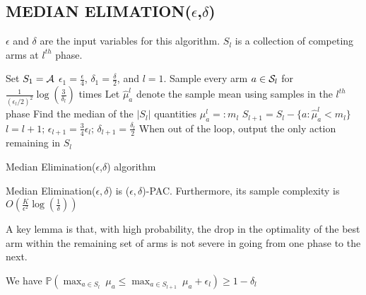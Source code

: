 \documentclass[11pt]{article}
\begin{document}
\subsection{MEDIAN ELIMATION($\epsilon$,$\delta$)}

$\epsilon$ and $\delta$ are the input variables for this algorithm. $S_l$ is a collection of competing arms at $l^{th}$ phase. 

\begin{algorithm}
	\begin{algorithmic}[1]
		\STATE Set $S_1 = \mathcal{A}$
		\STATE $\epsilon_1 = \frac{\epsilon}{4}$,  $\delta_1 = \frac{\delta}{2}$, and  $l = 1$. 
			\STATE Sample every arm $a \in \mathcal{S}_l$ for $\frac{1}{(\epsilon_l/2)^2}\log(\frac{3}{\delta_l})$ times
			\STATE Let $\hat\mu_a^l$ denote the sample mean using samples in the $l^{th}$ phase
			\STATE Find the median of the $|S_l|$ quantities $\mu_a^l =: m_l$
			\STATE $S_{l+1} = S_l - \{a : \hat\mu_a^l < m_l\}$
			\STATE $l = l + 1\textit{; } \epsilon_{l + 1} = \frac{3}{4}\epsilon_l \textit{;  } \delta_{l + 1} = \frac{\delta_l}{2}$
 		\ENDWHILE
		\STATE When out of the loop, output the only action remaining in $S_l$
		\end{algorithmic}
		\caption{Median Elimination($\epsilon$,$\delta$) algorithm}
\end{algorithm}


\begin{theorem}
	Median Elimination($\epsilon, \delta$) is ($\epsilon, \delta$)-PAC. Furthermore, its sample complexity is $O(\frac{K}{\epsilon^2}\log(\frac{1}{\delta}))$
\end{theorem}

A key lemma is that, with high probability, the drop in the optimality of the best arm within the remaining set of arms is not severe in going from one phase to the next.

\begin{lemma}
	We have $\mathbb{P}(\max_{a\in S_{l} }\ \mu_a \leq \max_{a\in S_{l+1}}\ \mu_a + \epsilon_l) \geq 1 - \delta_l$ \\ 
\end{lemma}
\end{document}
